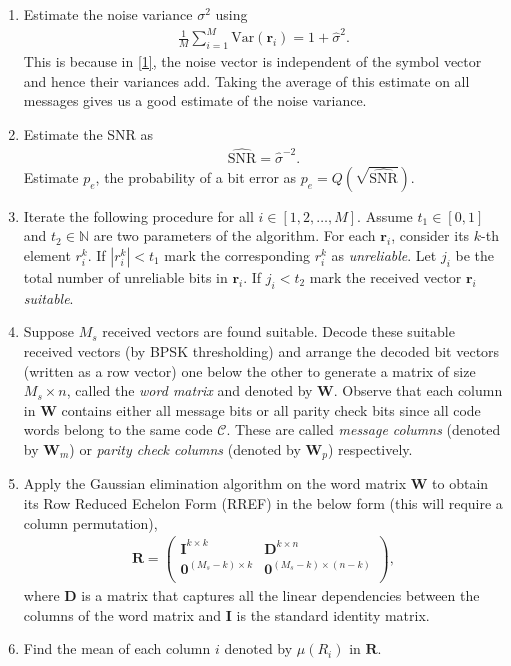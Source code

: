 \documentclass[conference]{IEEEtran}
\def\r{\mathbf{r}}
\begin{document}
 \begin{enumerate}
    
     \item Estimate the noise variance $\sigma^2$ using \begin{align*}
        \frac1M \sum_{i=1}^M\text{Var}(\r_i) = 1 + \hat{\sigma}^2.
    \end{align*}  This is because in  \eqref{1}, the noise vector is independent of the symbol vector and hence their variances add. Taking the average of this estimate on all messages gives us a good estimate of the noise variance.
    \item Estimate the SNR as 
    \begin{align*}
        \hat{\text{SNR}} = \hat{\sigma}^{-2}.
    \end{align*}
     Estimate $p_e$, the probability of a bit error as
$       p_e = Q\left(\sqrt{\hat{\text{SNR}}}\right)$.
    \item Iterate the following procedure for all $i \in [1, 2, \ldots , M]$. Assume $t_1 \in [0, 1]$ and $t_2 \in \mathbb{N}$ are two parameters of the algorithm. For each  $\r_i$,  consider its $k$-th element $r_i^k$. If $|r_i^k| < t_1$ mark the corresponding $r_i^k$ as \textit{unreliable}. Let $j_i$ be the total number of unreliable bits in $\r_i$. If $j_i < t_2$ mark the received vector $\r_i$ \textit{suitable}.
    \item Suppose $M_s$ received vectors are found suitable. Decode these suitable received vectors (by BPSK thresholding) and  arrange the decoded bit vectors (written as a row vector) one below the other to generate a matrix of size $M_s \times n$, called the \textit{word matrix} and denoted by $\mathbf{W}$. Observe that each column in $\mathbf{W}$ contains either all message bits or all parity check bits since all code words belong to the same code $\mathcal{C}$. These are called \textit{message columns} (denoted by $\mathbf{W}_m$) or \textit{parity check columns} (denoted by $\mathbf{W}_p$) respectively.
    \item Apply the Gaussian elimination algorithm on the word matrix $\mathbf{W}$ to obtain its Row Reduced Echelon Form (RREF) in the below form (this will require a column permutation),
    \begin{align*}
        \mathbf{R} = \begin{pmatrix}
    \mathbf{I}^{k \times k} & \mathbf{D}^{k \times n} \\
     \mathbf{0}^{(M_s-k)\times k} & \mathbf{0}^{(M_s-k)\times (n-k)}\\
\end{pmatrix},
    \end{align*}
    where $\mathbf{D}$ is a matrix that captures all the linear dependencies between the columns of the word matrix and $\mathbf{I}$ is the standard identity matrix.
    \item Find the mean of each column $i$ denoted by $\mu(R_i)$ in $\mathbf{R}$. 
   

\end{enumerate}
\end{document}
